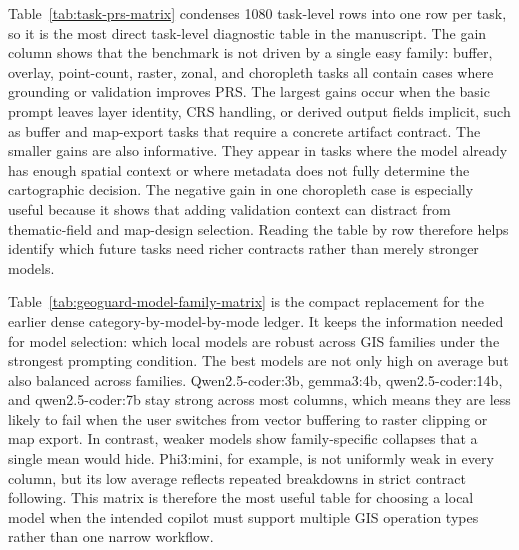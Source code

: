 \documentclass[12pt]{gsis}  %
\begin{document}
\clearpage



Table~\ref{tab:task-prs-matrix} condenses 1080 task-level rows into one row per task, so it is the most direct task-level diagnostic table in the manuscript. The gain column shows that the benchmark is not driven by a single easy family: buffer, overlay, point-count, raster, zonal, and choropleth tasks all contain cases where grounding or validation improves PRS. The largest gains occur when the basic prompt leaves layer identity, CRS handling, or derived output fields implicit, such as buffer and map-export tasks that require a concrete artifact contract. The smaller gains are also informative. They appear in tasks where the model already has enough spatial context or where metadata does not fully determine the cartographic decision. The negative gain in one choropleth case is especially useful because it shows that adding validation context can distract from thematic-field and map-design selection. Reading the table by row therefore helps identify which future tasks need richer contracts rather than merely stronger models.



Table~\ref{tab:geoguard-model-family-matrix} is the compact replacement for the earlier dense category-by-model-by-mode ledger. It keeps the information needed for model selection: which local models are robust across GIS families under the strongest prompting condition. The best models are not only high on average but also balanced across families. Qwen2.5-coder:3b, gemma3:4b, qwen2.5-coder:14b, and qwen2.5-coder:7b stay strong across most columns, which means they are less likely to fail when the user switches from vector buffering to raster clipping or map export. In contrast, weaker models show family-specific collapses that a single mean would hide. Phi3:mini, for example, is not uniformly weak in every column, but its low average reflects repeated breakdowns in strict contract following. This matrix is therefore the most useful table for choosing a local model when the intended copilot must support multiple GIS operation types rather than one narrow workflow.


\end{document}

